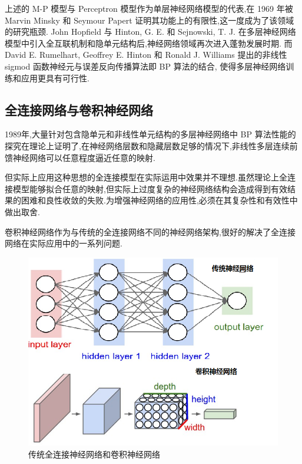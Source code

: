 上述的 M-P 模型与 Perceptron 模型作为单层神经网络模型的代表,在 1969 年被 Marvin Minsky 和 Seymour Papert 证明其功能上的有限性,这一度成为了该领域的研究瓶颈. John Hopfield 与 Hinton, G. E. 和 Sejnowski, T. J. 在多层神经网络模型中引入全互联机制和隐单元结构后,神经网络领域再次进入蓬勃发展时期. 而 David E. Rumelhart, Geoffrey E. Hinton 和 Ronald J. Williams 提出的非线性 sigmod 函数神经元与误差反向传播算法即 BP 算法的结合, 使得多层神经网络训练和应用更具有可行性.

\subsection{全连接网络与卷积神经网络}

1989年,大量针对包含隐单元和非线性单元结构的多层神经网络中 BP 算法性能的探究在理论上证明了,在神经网络层数和隐藏层数足够的情况下,非线性多层连续前馈神经网络可以任意程度逼近任意的映射.

但实际上应用这种思想的全连接模型在实际运用中效果并不理想.虽然理论上全连接模型能够拟合任意的映射,但实际上过度复杂的神经网络结构会造成得到有效结果的困难和良性收敛的失败.为增强神经网络的应用性,必须在其复杂性和有效性中做出取舍.

卷积神经网络作为与传统的全连接网络不同的神经网络架构,很好的解决了全连接网络在实际应用中的一系列问题.


\begin{figure}
	\centering
	\includegraphics[scale=0.4]{Figures/CNN.png}
	\caption{传统全连接神经网络和卷积神经网络}
\end{figure}


